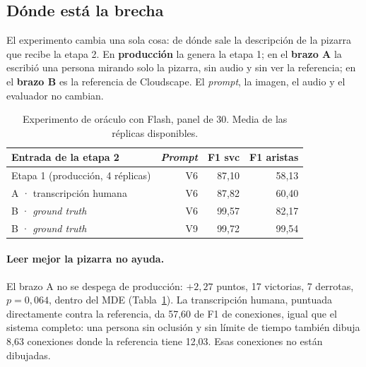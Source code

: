 \documentclass[a4paper, twocolumn, 10pt]{IEEEtran}
\begin{document}
\subsection{Dónde está la brecha}
\label{sec:oraculo}

El experimento cambia una sola cosa: de dónde sale la descripción de la pizarra que
recibe la etapa 2. En \textbf{producción} la genera la etapa 1; en el \textbf{brazo
A} la escribió una persona mirando solo la pizarra, sin audio y sin ver la
referencia; en el \textbf{brazo B} es la referencia de Cloudscape. El \emph{prompt},
la imagen, el audio y el evaluador no cambian.

\begin{table}[H]
\centering\small\setlength{\tabcolsep}{4pt}
\caption{Experimento de oráculo con Flash, panel de 30. Media de las réplicas
disponibles.}
\label{tab:oraculos}
\begin{tabular}{lrrr}
\toprule
Entrada de la etapa 2 & \emph{Prompt} & F1 svc & F1 aristas\\
\midrule
Etapa 1 (producción, 4 réplicas) & V6 & 87,10 & 58,13\\
A · transcripción humana         & V6 & 87,82 & 60,40\\
B · \emph{ground truth}          & V6 & 99,57 & 82,17\\
B · \emph{ground truth}          & V9 & 99,72 & 99,54\\
\bottomrule
\end{tabular}
\end{table}

\paragraph{Leer mejor la pizarra no ayuda.} El brazo A no se despega de producción:
$+2{,}27$ puntos, 17 victorias, 7 derrotas, $p=0{,}064$, dentro del MDE
(Tabla~\ref{tab:oraculos}). La transcripción humana, puntuada directamente contra la
referencia, da 57,60 de F1 de conexiones, igual que el sistema completo: una persona
sin oclusión y sin límite de tiempo también dibuja 8,63 conexiones donde la
referencia tiene 12,03. Esas conexiones no están dibujadas.
\end{document}
